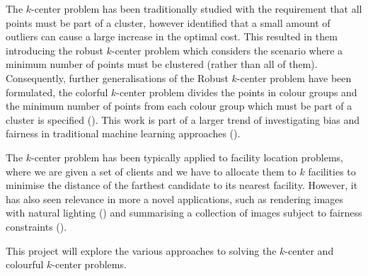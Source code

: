The $k$-center problem has been traditionally studied with the requirement that all points must be part of a cluster, however \textcite{charikar_algorithms_2001} identified that a small amount of outliers can cause a large increase in the optimal cost. This resulted in them introducing the robust $k$-center problem which considers the scenario where a minimum number of points must be clustered (rather than all of them). Consequently, further generalisations of the Robust $k$-center problem have been formulated, the colorful $k$-center problem divides the points in colour groups and the minimum number of points from each colour group which must be part of a cluster is specified (\cite{bandyapadhyay_constant_2019}). This work is part of a larger trend of investigating bias and fairness in traditional machine learning approaches (\cite{mehrabi_survey_2019, anegg_technique_2020}).

The $k$-center problem has been typically applied to facility location problems, where we are given a set of clients and we have to allocate them to $k$ facilities to minimise the distance of the farthest candidate to its nearest facility. However, it has also seen relevance in more a novel applications, such as rendering images with natural lighting (\cite{agarwal_structured_2003}) and summarising a collection of images subject to fairness constraints (\cite{kleindessner_fair_2019}).

This project will explore the various approaches to solving the $k$-center and colourful $k$-center problems.

%